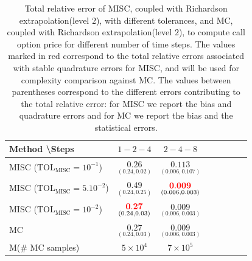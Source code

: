 \begin{table}[!h]
	\centering
	\begin{tabular}{l*{6}{c}r}
		Method \textbackslash  Steps            & $1-2-4$ & $2-4-8$  \\
		\hline

		MISC ($\text{TOL}_{\text{MISC}}=10^{-1}$)  & $\underset{(0.24,0.02)}{\mathbf{ 0.26
		}}$ & $\underset{(0.006,0.107)}{\mathbf{ 0.113}}$ \\
		MISC ($\text{TOL}_{\text{MISC}}=5.10^{-2}$)  & $\underset{(0.24,0.25)}{\mathbf{   0.49
		}}$ & $\underset{(0.006,0.003)}{\mathbf{{\color{red} 0.009} }}$  \\
		MISC ($\text{TOL}_{\text{MISC}}=10^{-2}$)  & $\underset{(0.24,0.03)}{\mathbf{ {\color{red}0.27}}}$ & $\underset{(0.006,0.003)}{\mathbf{ 0.009 }}$    \\	

		\hline
		MC   & $\underset{(0.24,0.03)}{\mathbf{0.27}}$  & $\underset{(0.006,0.003)}{\mathbf{0.009}}$    \\
			M(\# MC samples) & $5 \times 10^4$  & $7 \times 10^5$   \\
		\hline
	\end{tabular}
	\caption{Total relative  error of MISC, coupled with Richardson extrapolation(level $2$), with different tolerances, and MC, coupled with Richardson extrapolation(level $2$), to compute call option price for different number of time steps. The values marked in red correspond to the total relative errors associated with  stable quadrature errors for MISC, and will be used for complexity comparison against MC. The values between parentheses correspond to the different errors contributing to the total relative error: for MISC we report the bias and quadrature errors and for MC we report the bias and the statistical errors. }
	\label{Total  error of MISC and MC to compute Call option price of the different tolerances for different number of time steps. Case set $2$ parameters, with Richardson extrapolation(level $2$). The numbers between parentheses are the corresponding absolute errors,linear}
\end{table}
\FloatBarrier

